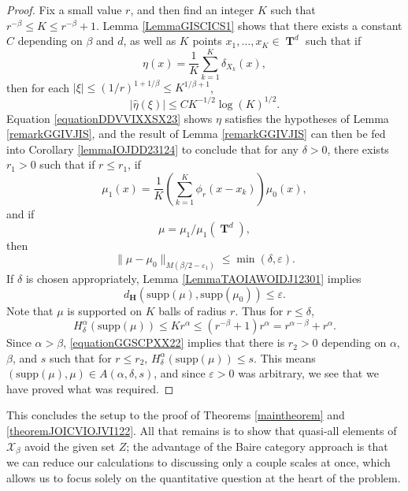 \documentclass[dvipsnames,letterpaper,12pt]{article}
\numberwithin{equation}{section}
\DeclareMathOperator{\TT}{\mathbf{T}}
\numberwithin{theorem}{section}
\begin{document}
\begin{proof}
    Fix a small value $r$, and then find an integer $K$ such that $r^{-\beta} \leq K \leq r^{-\beta} + 1$. Lemma \ref{LemmaGISCICS1} shows that there exists a constant $C$ depending on $\beta$ and $d$, as well as $K$ points $x_1, \dots, x_K \in \TT^d$ such that if
    \[ \eta(x) = \frac{1}{K} \sum_{k = 1}^K \delta_{X_k}(x), \]
    then for each $|\xi| \leq (1/r)^{1 + 1/\beta} \leq K^{1/\beta + 1}$,
    \begin{equation} \label{equationDDVVIXXSX23}
        |\widehat{\eta}(\xi)| \leq C K^{-1/2} \log(K)^{1/2}.
    \end{equation}
    Equation \eqref{equationDDVVIXXSX23} shows $\eta$ satisfies the hypotheses of Lemma \ref{remarkGGIVJIS}, and the result of Lemma \ref{remarkGGIVJIS} can then be fed into Corollary \ref{lemmaIOJDD23124} to conclude that for any $\delta > 0$, there exists $r_1 > 0$ such that if $r \leq r_1$, if
    \[ \mu_1(x) = \frac{1}{K} \left( \sum_{k = 1}^K \phi_{r}(x - x_k) \right) \mu_0(x), \]
    and if
    \[ \mu = \mu_1 / \mu_1(\TT^d), \]
    then
    \begin{equation} \label{equationYYUDUSC4434}
        \| \mu - \mu_0 \|_{M(\beta/2 - \varepsilon_1)} \leq \min(\delta,\varepsilon).
    \end{equation}
    If $\delta$ is chosen appropriately, Lemma \ref{LemmaTAOIAWOIDJ12301} implies
    \begin{equation}
        d_{\mathbf{H}}(\text{supp}(\mu),\text{supp}(\mu_0)) \leq \varepsilon.
    \end{equation}
    Note that $\mu$ is supported on $K$ balls of radius $r$. Thus for $r \leq \delta$,
    \begin{equation} \label{equationGGSCPXX22}
        H^\alpha_\delta(\text{supp}(\mu)) \leq K r^\alpha \leq (r^{-\beta} + 1) r^\alpha = r^{\alpha - \beta} + r^\alpha.
    \end{equation}
    Since $\alpha > \beta$, \eqref{equationGGSCPXX22} implies that there is $r_2 > 0$ depending on $\alpha$, $\beta$, and $s$ such that for $r \leq r_2$, $H^\alpha_\delta(\text{supp}(\mu)) \leq s$. This means $(\text{supp}(\mu),\mu) \in A(\alpha,\delta,s)$, and since $\varepsilon > 0$ was arbitrary, we see that we have proved what was required.
\end{proof}

This concludes the setup to the proof of Theorems \ref{maintheorem} and \ref{theoremJOICVIOJVI122}. All that remains is to show that quasi-all elements of $\mathcal{X}_\beta$ avoid the given set $Z$; the advantage of the Baire category approach is that we can reduce our calculations to discussing only a couple scales at once, which allows us to focus solely on the quantitative question at the heart of the problem.
\end{document}
